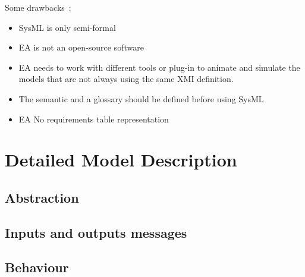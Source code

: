 \documentclass{template/openetcs_article}
\begin{document}
Some drawbacks~:
\begin{itemize}
\item SysML is only semi-formal
\item EA is not an  open-source software
\item EA needs to work with different tools or plug-in to animate and simulate
the models that are not always using the same XMI definition.
\item The semantic and a glossary should be defined before using SysML
\item EA No requirements table representation
\end{itemize}


\section{Detailed Model Description}
\label{sec:deta-model-descr}
  \subsection{Abstraction}
  

  \subsection{Inputs and outputs messages}
  

  \subsection{Behaviour}
  \label{subsec:behavior}
  





\end{document}
